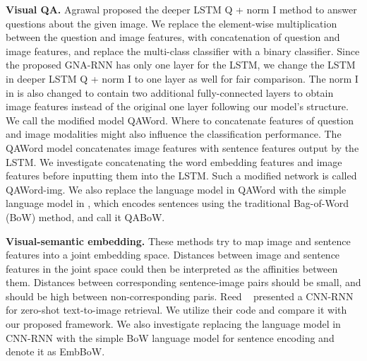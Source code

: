 \textbf{Visual QA.}
Agrawal \etal \cite{antol2015vqa} proposed the deeper LSTM Q + norm I method to answer questions about the given image. We replace the element-wise multiplication between the question and image features, with concatenation of question and image features, and replace the multi-class classifier with a binary classifier. 
Since the proposed GNA-RNN has only one layer for the LSTM, we change the LSTM in deeper LSTM Q + norm I to one layer as well for fair comparison. The norm I in \cite{antol2015vqa} is also changed to contain two additional fully-connected layers to obtain image features instead of the original one layer following our model's structure.
We call the modified model QAWord.
Where to concatenate features of question and image modalities might also influence the classification performance. The QAWord model concatenates image features with sentence features output by the LSTM. We investigate concatenating the word embedding features and image features before inputting them into the LSTM. Such a modified network is called QAWord-img. We also replace the language model in QAWord with the simple language model in \cite{zhou2015simple}, which encodes sentences using the traditional Bag-of-Word (BoW) method, and call it QABoW. 

\textbf{Visual-semantic embedding.}
These methods try to map image and sentence features into a joint embedding space.
Distances between image and sentence features in the joint space could then be interpreted as the affinities between them.
Distances between corresponding sentence-image pairs should be small, and should be high between non-corresponding paris.
Reed \etal~\cite{reed2016learning} presented a CNN-RNN for zero-shot text-to-image retrieval. We utilize their code and compare it with our proposed framework. We also investigate replacing the language model in CNN-RNN with the simple BoW language model \cite{zhou2015simple} for sentence encoding and denote it as EmbBoW.


